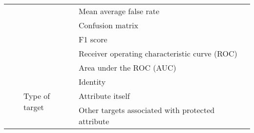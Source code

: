 \begin{table*}[htbp]
{\begin{tabular}{ll|llc}
                              &                                                                    &                                                  & Mean average false rate                       & \cite{inclusivefacenet}                                                                                    \\
                              &                                                                    &                                                  & Confusion matrix                              & \cite{DebFace}                                                                                             \\
                              &                                                                    &                                                  & F1 score                                      & \cite{BR_Net_dataset_vs_task}                                                                              \\
                              &                                                                    &                                                  & Receiver operating characteristic curve (ROC) & \cite{SAN, Asymmetric_Rejection_Loss,debias_balanced_AUCROC} \\
                              &                                                                    &                                                  & Area under the ROC (AUC)                & \cite{FlowSAN, DebFace, BR_Net_dataset_vs_task}                                                            \\
                             \cmidrule{3-5} 
                              &                                                                    & \multirow{3}{*}{Type of target}                  & Identity                                      & \cite{RL_RBN, RFW_IMAN, GAC}                                                                               \\
                              &                                                                    &                                                  & Attribute itself                              & \cite{Timnit_sex_classification_PPB,MTCNN,DB_VAE_algorithmic_bias}                                         \\
                              &                                                                    &                                                  & Other targets associated with protected attribute    & \cite{representation_disparity, BR_Net_dataset_vs_task,fairfil}                                                    \\

\end{tabular}}
\end{table*}
